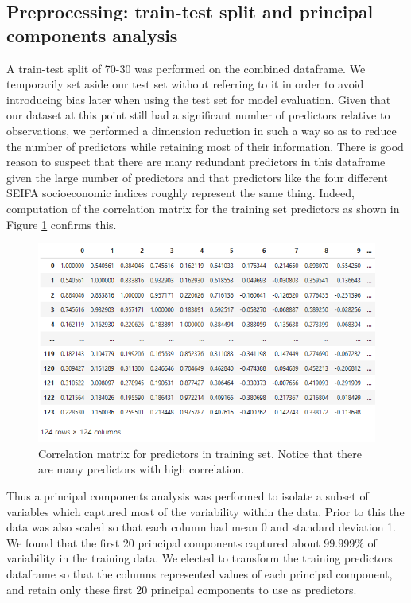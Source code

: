 \documentclass[a4paper]{article}
\begin{document}
\subsection{Preprocessing: train-test split and principal components analysis}

A train-test split of 70-30 was performed on the combined dataframe. We temporarily set aside our test set without referring to it in order to avoid introducing bias later when using the test set for model evaluation. Given that our dataset at this point still had a significant number of predictors relative to observations, we performed a dimension reduction in such a way so as to reduce the number of predictors while retaining most of their information. There is good reason to suspect that there are many redundant predictors in this dataframe given the large number of predictors and that predictors like the four different SEIFA socioeconomic indices roughly represent the same thing. Indeed, computation of the correlation matrix for the training set predictors as shown in Figure \ref{fig:fig9} confirms this. \\

\begin{figure}
\centering
  \includegraphics[width=\linewidth]{fig9.png}
  \caption{Correlation matrix for predictors in training set. Notice that there are many predictors with high correlation.}
  \label{fig:fig9}
\end{figure}

Thus a principal components analysis was performed to isolate a subset of variables which captured most of the variability within the data. Prior to this the data was also scaled so that each column had mean 0 and standard deviation 1. We found that the first 20 principal components captured about 99.999\% of variability in the training data. We elected to transform the training predictors dataframe so that the columns represented values of each principal component, and retain only these first 20 principal components to use as predictors.
\end{document}
